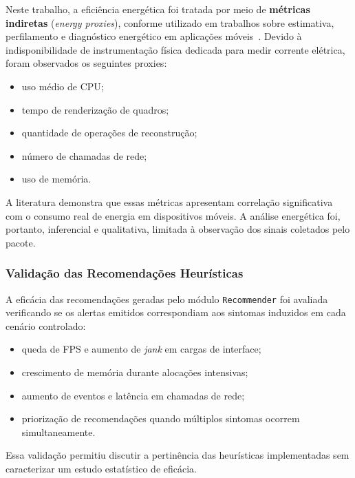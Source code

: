 Neste trabalho, a eficiência energética foi tratada por meio de \textbf{métricas indiretas}
(\textit{energy proxies}), conforme utilizado em trabalhos sobre estimativa,
perfilamento e diagnóstico energético em aplicações móveis~\cite{hao2013estimating,li2014empirical,hoque2015energy,sun2023energyinefficiency}.
Devido à indisponibilidade de instrumentação física dedicada para medir corrente elétrica, foram observados os seguintes proxies:

\begin{itemize}
    \item uso médio de CPU;
    \item tempo de renderização de quadros;
    \item quantidade de operações de reconstrução;
    \item número de chamadas de rede;
    \item uso de memória.
\end{itemize}

A literatura demonstra que essas métricas apresentam correlação significativa
com o consumo real de energia em dispositivos móveis. A análise energética foi, portanto, inferencial e qualitativa, limitada à observação dos sinais coletados pelo pacote.


\subsubsection{Validação das Recomendações Heurísticas}

A eficácia das recomendações geradas pelo módulo \texttt{Recommender}
foi avaliada verificando se os alertas emitidos correspondiam aos sintomas induzidos em cada cenário controlado:

\begin{itemize}
    \item queda de FPS e aumento de \textit{jank} em cargas de interface;
    \item crescimento de memória durante alocações intensivas;
    \item aumento de eventos e latência em chamadas de rede;
    \item priorização de recomendações quando múltiplos sintomas ocorrem simultaneamente.
\end{itemize}

Essa validação permitiu discutir a pertinência das heurísticas implementadas sem caracterizar um estudo estatístico de eficácia.





